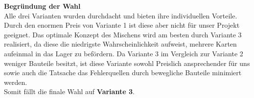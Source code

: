 \begin{table}[H]
\centering
{}
    \caption{Vergleich der Varianten}
\end{table}

\textbf{\large{Begründung der Wahl}}\\
Alle drei Varianten wurden durchdacht und bieten ihre individuellen Vorteile. Durch den enormen Preis von
Variante 1 ist diese aber nicht für unser Projekt geeignet. Das optimale Konzept des Mischens wird am besten durch
Variante 3 realisiert, da diese die niedrigste Wahrscheinlichkeit aufweist, mehrere Karten aufeinmal in das Lager zu befördern.
Da Variante 3 im Vergleich zur Variante 2 weniger Bauteile besitzt, ist diese Variante sowohl Preislich ansprechender für uns
 sowie auch die Tatsache das Fehlerquellen durch bewegliche Bauteile minimiert werden. \\
Somit fällt die finale Wahl auf \textbf{Variante 3}.



